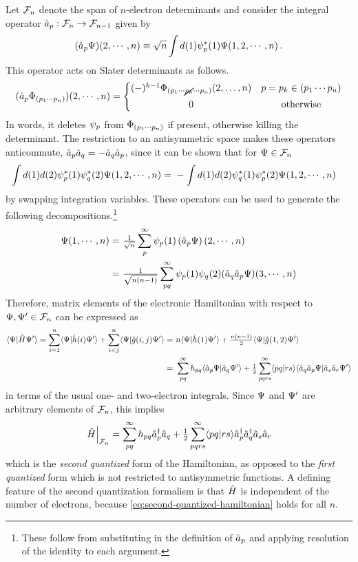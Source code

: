 \documentclass[11pt]{article}
\numberwithin{equation}{section}
\begin{document}
Let $\mathcal{F}_n$ denote the span of $n$-electron determinants and consider the integral operator $\hat{a}_p:\mathcal{F}_n\rightarrow \mathcal{F}_{n-1}$ given by
\begin{align}
  (\hat{a}_p\Psi )(2,\cdots,n)
\equiv
  \sqrt{n}\int d(1) \psi _p^*(1)\Psi (1,2,\cdots,n)\,.
\end{align}
This operator acts on Slater determinants as follows.
\begin{align}
  (\op{a}_p\F_{(p_1\cd p_n)})(2,\cd,n)
=
\left\{
\ar{
  (-)^{k-1}\F_{(p_1\cd \cancel{p_k}\cd p_n)}(2,\ld,n) & p=p_k\in(p_1\cd p_n)\\[5pt]
  0 & \text{otherwise}
}
\right.
\end{align}
In words, it deletes $\psi _p$ from $\Phi _{(p_1\cdots p_n)}$ if present, otherwise killing the determinant.
The restriction to an antisymmetric space makes these operators anticommute, $\hat{a}_p\hat{a}_q=-\hat{a}_q\hat{a}_p$, since it can be shown that for $\Psi \in\mathcal{F}_n$
\begin{align*}
  \int d(1)d(2)\psi _p^*(1)\psi _q^*(2)\Psi (1,2,\cdots,n)
=&\
-
  \int d(1)d(2)\psi _q^*(1)\psi _p^*(2)\Psi (1,2,\cdots,n)
\end{align*}
by swapping integration variables.
These operators can be used to generate the following decompositions.\footnote{These follow from substituting in the definition of $\hat{a}_p$ and applying resolution of the identity to each argument.}
\begin{align}
  \Psi (1,\cdots,n)
=&\
  \tfrac{1}{\sqrt{n}}
  \sum_p^\infty\psi _p(1)\left(\hat{a}_p\Psi \right)(2,\cdots,n)
\\=&\
  \tfrac{1}{\sqrt{n(n-1)}}
  \sum_{pq}^\infty
  \psi _p(1)\psi _q(2)(\hat{a}_q\hat{a}_p\Psi )(3,\cdots,n)
\end{align}
Therefore, matrix elements of the electronic Hamiltonian with respect to $\Psi ,\Psi '\in \mathcal{F}_n$ can be expressed as
\begin{align*}
  \langle\Psi |\hat{H}\Psi '\rangle
=
  \sum_{i=1}^n\langle\Psi |\hat{h}(i)\Psi '\rangle
+
  \sum_{i<j}^n\langle\Psi |\hat{g}(i,j)\Psi '\rangle
=&\
  n\langle\Psi |\hat{h}(1)\Psi '\rangle
+
  \tfrac{n(n-1)}{2}
  \langle\Psi |\hat{g}(1,2)\Psi '\rangle
\\=&\
  \sum_{pq}^\infty
  h_{pq}\langle\hat{a}_p\Psi |\hat{a}_q\Psi '\rangle
+
  \tfrac{1}{2}
  \sum_{pqrs}^\infty
  \langle pq|rs\rangle\langle\hat{a}_q\hat{a}_p\Psi |\hat{a}_s\hat{a}_r\Psi '\rangle
\end{align*}
in terms of the usual one- and two-electron integrals.
Since $\Psi $ and $\Psi '$ are arbitrary elements of $\mathcal{F}_n$, this implies
\begin{align}\label{eq:second-quantized-hamiltonian}
  \left.
  \hat{H}
  \right|_{\mathcal{F}_n}
=
  \sum_{pq}^\infty
  h_{pq}
  \hat{a}_p^\dagger \hat{a}_q
+
  \tfrac{1}{2}
  \sum_{pqrs}^\infty
  \langle pq|rs\rangle
  \hat{a}_p^\dagger\hat{a}_q^\dagger\hat{a}_s\hat{a}_r
\end{align}
which is the \textit{second quantized} form of the Hamiltonian, as opposed to the \textit{first quantized} form which is not restricted to antisymmetric functions.
A defining feature of the second quantization formalism is that $\hat{H}$ is independent of the number of electrons, because \cref{eq:second-quantized-hamiltonian} holds for all $n$.
\end{document}
